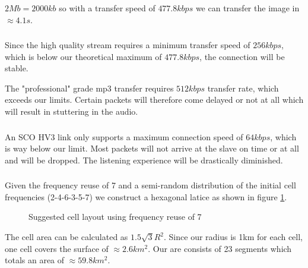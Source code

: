 \documentclass[12pt]{article}
\newcommand{\multipartexercise}{\addtocounter{subsection}{1}\setcounter{subsubsection}{0}}
\newcommand{\exercisepart}{\subsubsection{}}
\begin{document}
\exercisepart
$2Mb=2000kb$ so with a transfer speed of $477.8kbps$ we can transfer the image in $\approx4.1s$.

\exercisepart
Since the high quality stream requires a minimum transfer speed of $256kbps$, which is below our theoretical maximum of $477.8kbps$, the connection will be stable.

The "professional" grade mp3 transfer requires $512kbps$ transfer rate, which exceeds our limits. Certain packets will therefore come delayed or not at all which will result in stuttering in the audio.

\exercisepart
An SCO HV3 link only supports a maximum connection speed of $64kbps$, which is way below our limit. Most packets will not arrive at the slave on time or at all and will be dropped. The listening experience will be drastically diminished.

\multipartexercise
\exercisepart
Given the frequency reuse of 7 and a semi-random distribution of the initial cell frequencies (2-4-6-3-5-7) we construct a hexagonal latice as shown in figure \ref{celllayout}.

\begin{figure}[!h]
\centering
{}
\caption{Suggested cell layout using frequency reuse of 7}
\label{celllayout}
\end{figure}

The cell area can be calculated as $1.5\sqrt{3}R^2$. Since our radius is 1km for each cell, one cell covers the surface of $\approx2.6km^2$. Our are consists of 23 segments which totals an area of $\approx59.8km^2$.

\exercisepart
\end{document}
